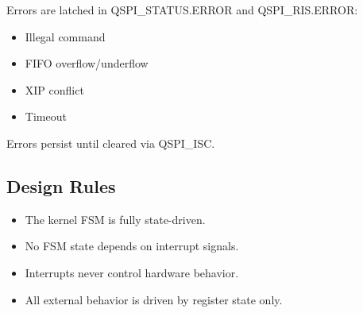 Errors are latched in QSPI\_STATUS.ERROR and QSPI\_RIS.ERROR:

\begin{itemize}
  \item Illegal command
  \item FIFO overflow/underflow
  \item XIP conflict
  \item Timeout
\end{itemize}

Errors persist until cleared via QSPI\_ISC.

\subsection{Design Rules}

\begin{itemize}
  \item The kernel FSM is fully state-driven.
  \item No FSM state depends on interrupt signals.
  \item Interrupts never control hardware behavior.
  \item All external behavior is driven by register state only.
\end{itemize}
